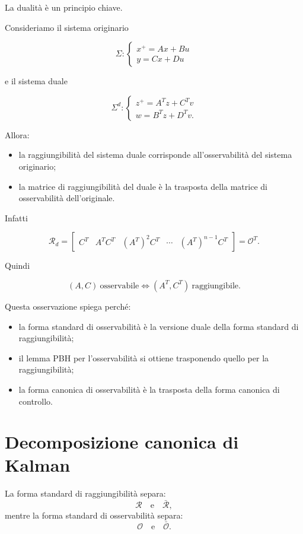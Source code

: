 La dualità è un principio chiave.

Consideriamo il sistema originario

\[
\Sigma:
\begin{cases}
x^+ = Ax + Bu \\
y = Cx + Du
\end{cases}
\]

e il sistema duale

\[
\Sigma^d:
\begin{cases}
z^+ = A^Tz + C^Tv \\
w = B^Tz + D^Tv.
\end{cases}
\]

Allora:
\begin{itemize}
    \item la raggiungibilità del sistema duale corrisponde all'osservabilità del sistema originario;
    \item la matrice di raggiungibilità del duale è la trasposta della matrice di osservabilità dell'originale.
\end{itemize}

Infatti

\[
\mathcal R_d=
\begin{bmatrix}
C^T & A^TC^T & (A^T)^2C^T & \cdots & (A^T)^{n-1}C^T
\end{bmatrix}
=
\mathcal O^T.
\]

Quindi

\[
(A,C)\ \text{osservabile}
\iff
(A^T,C^T)\ \text{raggiungibile}.
\]

Questa osservazione spiega perché:
\begin{itemize}
    \item la forma standard di osservabilità è la versione duale della forma standard di raggiungibilità;
    \item il lemma PBH per l'osservabilità si ottiene trasponendo quello per la raggiungibilità;
    \item la forma canonica di osservabilità è la trasposta della forma canonica di controllo.
\end{itemize}

\bigskip

\section{Decomposizione canonica di Kalman}

La forma standard di raggiungibilità separa:
\[
\mathcal R \quad\text{e}\quad \bar{\mathcal R},
\]
mentre la forma standard di osservabilità separa:
\[
\mathcal O \quad\text{e}\quad \bar{\mathcal O}.
\]

